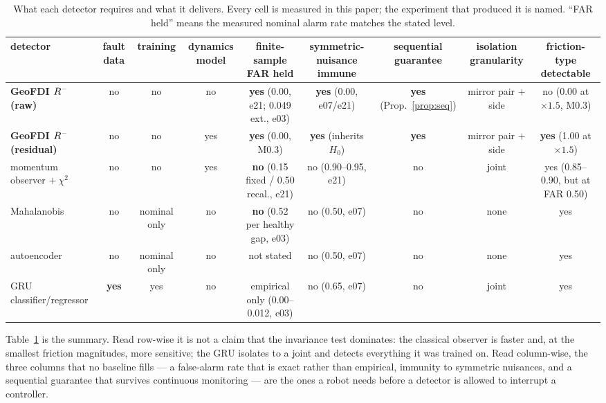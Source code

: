 \begin{table}[t]
\centering
\caption{What each detector requires and what it delivers. Every cell is measured in this paper; the experiment that
produced it is named. ``FAR held'' means the measured nominal alarm rate matches the stated level.}
\label{tab:claims}
\footnotesize
\begin{tabular}{@{}lcccccccc@{}}
\toprule
detector & fault data & training & dynamics model & finite-sample FAR held & symmetric-nuisance immune &
sequential guarantee & isolation granularity & friction-type detectable \\
\midrule
\textbf{GeoFDI $R^{-}$ (raw)} & no & no & no &
  \textbf{yes} (0.00, e21; 0.049 ext., e03) & \textbf{yes} (0.00, e07/e21) & \textbf{yes} (Prop.~\ref{prop:seq}) &
  mirror pair $+$ side & no (0.00 at $\times1.5$, M0.3) \\
\textbf{GeoFDI $R^{-}$ (residual)} & no & no & yes &
  \textbf{yes} (0.00, M0.3) & \textbf{yes} (inherits $H_0$) & \textbf{yes} &
  mirror pair $+$ side & \textbf{yes} (1.00 at $\times1.5$) \\
momentum observer $+\ \chi^2$ & no & no & yes &
  \textbf{no} (0.15 fixed / 0.50 recal., e21) & no (0.90--0.95, e21) & no & joint &
  yes (0.85--0.90, but at FAR 0.50) \\
Mahalanobis & no & nominal only & no &
  \textbf{no} (0.52 per healthy gap, e03) & no (0.50, e07) & no & none & yes \\
autoencoder & no & nominal only & no &
  not stated & no (0.50, e07) & no & none & yes \\
GRU classifier/regressor & \textbf{yes} & yes & no &
  empirical only (0.00--0.012, e03) & no (0.65, e07) & no & joint & yes \\
\bottomrule
\end{tabular}
\end{table}

Table~\ref{tab:claims} is the summary. Read row-wise it is not a claim that the invariance test dominates: the classical
observer is faster and, at the smallest friction magnitudes, more sensitive; the GRU isolates to a joint and detects
everything it was trained on. Read column-wise, the three columns that no baseline fills --- a false-alarm rate that is
exact rather than empirical, immunity to symmetric nuisances, and a sequential guarantee that survives continuous
monitoring --- are the ones a robot needs before a detector is allowed to interrupt a controller.
